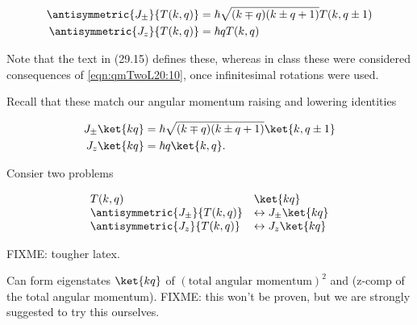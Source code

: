 \begin{align}\label{eqn:qmTwoL20:50}
\antisymmetric{J_{\pm}}{T(k, q)} &= \hbar \sqrt{(k \mp q)(k \pm q + 1)} T(k, q \pm 1) \\
\antisymmetric{J_{z}}{T(k, q)} &= \hbar q T(k, q)
\end{align}

Note that the text in (29.15) defines these, whereas in class these were considered consequences of \ref{eqn:qmTwoL20:10}, once infinitesimal rotations were used.

Recall that these match our angular momentum raising and lowering identities

\begin{align}\label{eqn:qmTwoL20:50b}
J_{\pm} \ket{k q} &= \hbar \sqrt{(k \mp q)(k \pm q + 1)} \ket{k, q \pm 1} \\
J_{z} \ket{k q} &= \hbar q \ket{k, q}.
\end{align}

Consier two problems 

\begin{equation}\label{eqn:qmTwoL20:70}
\begin{array}{l l}
T(k, q)						& \ket{k q} \\
\antisymmetric{J_{\pm}}{T(k, q)} 		&\leftrightarrow J_{\pm} \ket{k q} \\
\antisymmetric{J_{z}}{T(k, q)} 			&\leftrightarrow J_{z} \ket{k q}
\end{array}
\end{equation}

FIXME: tougher latex.
%

Can form eigenstates $\ket{kq}$ of $(\text{total angular momentum})^2$ and (z-comp of the total angular momentum).  
FIXME: this won't be proven, but we are strongly suggested to try this ourselves.

